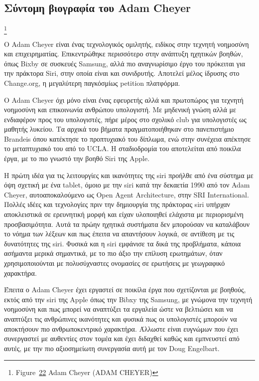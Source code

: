 \documentclass[
]{article}
\begin{document}
\hypertarget{ux3c3ux3cdux3bdux3c4ux3bfux3bcux3b7-ux3b2ux3b9ux3bfux3b3ux3c1ux3b1ux3c6ux3afux3b1-ux3c4ux3bfux3c5-adam-cheyer}{%
\subsection{Σύντομη βιογραφία του Adam
Cheyer}\label{ux3c3ux3cdux3bdux3c4ux3bfux3bcux3b7-ux3b2ux3b9ux3bfux3b3ux3c1ux3b1ux3c6ux3afux3b1-ux3c4ux3bfux3c5-adam-cheyer}}

\footnote{Figure~\protect\hyperlink{fig:adam-cheyer-profile}{22} Adam
  Cheyer (ADAM CHEYER)}

Ο Adam Cheyer είναι ένας τεχνολογικός ομιλητής, ειδίκος στην τεχνητή
νοημοσύνη και επιχειρηματίας. Επικεντρώθηκε περισσότερο στην ανάπτυξη
ηχητικών βοηθών, όπως Bixby σε συσκευές Samsung, αλλά πιο αναγνωρίσιμο
έργο του πρόκειται για την πράκτορα Siri, στην οποία είναι και
συνιδρυτής. Αποτελεί μέλος ίδρυσης στο Change.org, η μεγαλύτερη
παγκόσμίως petition πλατφόρμα.

Ο Adam Cheyer όχι μόνο είναι ένας εφευρετής αλλά και πρωτοπώρος για
τεχνητή νοημοσύνη και επικοινωνία ανθρώπου υπολογιστή. Με μηδενική γνώση
αλλά με ενδιαφέρον προς του υπολογιστές, πήρε μέρος στο σχολικό club για
υπολογιστές ως μαθητής λυκείου. Τα αρχικά του βήματα πραγματοποιήθηκαν
στο πανεπιστήμιο Brandeis όπου κατέκτησε το προπτυχιακό του δίπλωμα, ενώ
στην συνέχεια απέκτησε το μεταπτυχιακό του από το UCLA. Η σταδιοδρομία
του αποτελείται από ποικίλα έργα, με το πιο γνωστό την βοηθό Siri της
Apple.

Η πρώτη ιδέα για τις λειτουργίες και ικανότητες της siri προήλθε από ένα
σύστημα με όψη σχετική με ένα tablet, όμοιο με την siri κατά την
δεκαετία 1990 από τον Adam Cheyer, αυτοαποκαλούμενο ως Open Agent
Architecture, στην SRI International. Πολλές ιδέες και τεχνολογίες πριν
την δημιουργία της πράκτορας siri υπήρχαν αποκλειστικά σε ερευνητική
μορφή και είχαν υλοποιηθεί ελάχιστα με περιορισμένη προσβασιμότητα. Αυτά
τα πρώην ηχητικά συστήματα δεν μπορούσαν να καταλάβουν το νόημα των
λέξεων και πως έπειτα να απαντήσουν λογικά, σε αντίθεση με τις
δυνατότητες της siri. Φυσικά και η siri εμφάνισε τα δικά της προβλήματα,
κάποια ασήμαντα μερικά σημαντικά, με το πιο άξιο την επίλυση ερωτημάτων,
όταν χρησιμοποιούνται με πολυσύχναστες ονομασίες σε ερωτήσεις με
γεωγραφικό χαρακτήρα.

Έπειτα ο Adam Cheyer έχει εργαστεί σε ποικίλα έργα που σχετίζονται με
βοηθούς, εκτός από την siri της Apple όπως την Bibxy της Samsung, με
γνώμονα την τεχνητή νοημοσύνη και πως μπορεί να αναπτύξει τα εργαλεία
ώστε να βελτιώσει και να αναπτύξει τις ανθρώπινες ικανότητες και φυσικά
πως οι υπολογιστές μπορούν να αποκτήσουν πιο ανθρωποκεντρικό χαρακτήρα.
Άλλωστε είναι ευγνώμων που έχει συνεργαστεί με αυθεντίες στον τομέα και
έχει διδαχθεί καθώς και εμπνευστεί από αυτές, με την πιο αξιοσημείωτη
συνεργασία αυτή με τον Doug Engelbart.
\end{document}
